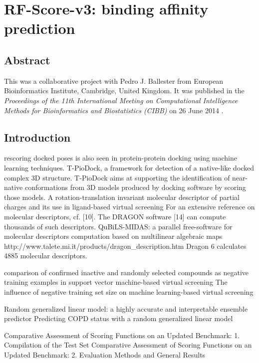 \chapter{RF-Score-v3: binding affinity prediction}

\section{Abstract}

This was a collaborative project with Pedro J. Ballester from European Bioinformatics Institute, Cambridge, United Kingdom. It was published in the \textit{Proceedings of the 11th International Meeting on Computational Intelligence Methods for Bioinformatics and Biostatistics (CIBB)} on 26 June 2014 \citep{1433}.


\section{Introduction}

\citep{1399} rescoring docked poses is also seen in protein-protein docking using machine learning techniques. T-PioDock, a framework for detection of a native-like docked complex 3D structure. T-PioDock aims at supporting the identification of near-native conformations from 3D models produced by docking software by scoring those models.
\citep{1389} A rotation-translation invariant molecular descriptor of partial charges and its use in ligand-based virtual screening
\citep{1389} For an extensive reference on molecular descriptors, cf. [10]. The DRAGON software [14] can compute thousands of such descriptors.
\citep{1400} QuBiLS-MIDAS: a parallel free-software for molecular descriptors computation based on multilinear algebraic maps
http://www.talete.mi.it/products/dragon\_description.htm Dragon 6 calculates 4885 molecular descriptors.

\citep{1423} comparison of confirmed inactive and randomly selected compounds as negative training examples in support vector machine-based virtual screening
\citep{1404} The influence of negative training set size on machine learning-based virtual screening

\citep{1377} Random generalized linear model: a highly accurate and interpretable ensemble predictor
\citep{1418} Predicting COPD status with a random generalized linear model

\citep{1426} Comparative Assessment of Scoring Functions on an Updated Benchmark: 1. Compilation of the Test Set
\citep{1411} Comparative Assessment of Scoring Functions on an Updated Benchmark: 2. Evaluation Methods and General Results

